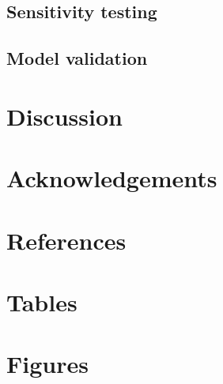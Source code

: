 \documentclass{article}
\begin{document}
\subsection{Sensitivity testing}

\subsection{Model validation}


\section{Discussion}


\section{Acknowledgements}

\section{References}


\section{Tables}


\section{Figures}


\vspace{20mm}

\end{document}
